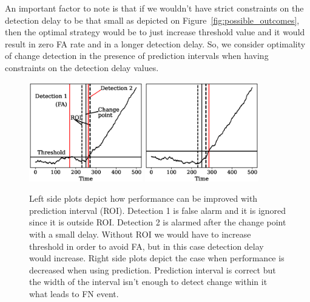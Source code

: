 An important factor to note is that if we wouldn't have strict constraints on the detection delay to be that small as depicted on Figure~\ref{fig:possible_outcomes}, then the optimal strategy would be to just increase threshold value and it would result in zero FA rate and in a longer detection delay.
So, we consider optimality of change detection in the presence of prediction intervals when having constraints on the detection delay values.
\begin{figure}[!htb]
	\begin{minipage}[t]{1.0\textwidth}
    \centering
    \includegraphics[width=0.44\textwidth, trim={1.5cm 1.0cm 0.3cm 1.0cm}]{pics/journal_paper/proof_of_concept2.eps}
    \includegraphics[width=0.44\textwidth, trim={1.5cm 1.0cm 0.3cm 1.0cm}]{pics/journal_paper/proof_of_concept2_fn_case.eps}
    \\
		
    \hspace{10mm}
		
		\caption{
    Left side plots depict how performance can be improved with prediction interval (ROI). 
    Detection 1 is false alarm and it is ignored since it is outside ROI. 
    Detection 2 is alarmed after the change point with a small delay. 
    Without ROI we would have to increase threshold in order to avoid FA, but in this case detection delay would increase.
    Right side plots depict the case when performance is decreased when using prediction. Prediction interval is correct but the width of the interval isn't enough to detect change within it what leads to FN event. 
}
\end{minipage}
\end{figure}
